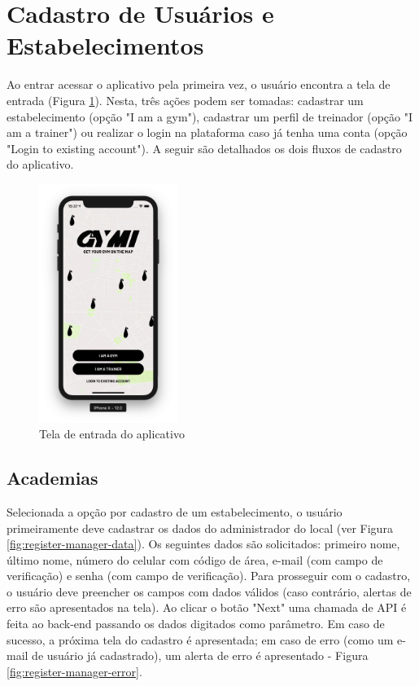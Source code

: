 \section{Cadastro de Usuários e Estabelecimentos}
Ao entrar acessar o aplicativo pela primeira vez, o usuário encontra a tela de entrada (Figura \ref{fig:landing}). Nesta, três ações podem ser tomadas: cadastrar um estabelecimento (opção "I am a gym"), cadastrar um perfil de treinador (opção "I am a trainer") ou realizar o login na plataforma caso já tenha uma conta (opção "Login to existing account"). A seguir são detalhados os dois fluxos de cadastro do aplicativo.
\begin{figure}[H]
    \centering
    \includegraphics[width=0.4\textwidth]{pfc/figuras/landing.png}
    \caption{Tela de entrada do aplicativo}
    \label{fig:landing}
\end{figure}

\subsection{Academias} \label{sec:register-gym}
Selecionada a opção por cadastro de um estabelecimento, o usuário primeiramente deve cadastrar os dados do administrador do local (ver Figura \ref{fig:register-manager-data}). Os seguintes dados são solicitados: primeiro nome, último nome, número do celular com código de área, e-mail (com campo de verificação) e senha (com campo de verificação). Para prosseguir com o cadastro, o usuário deve preencher os campos com dados válidos (caso contrário, alertas de erro são apresentados na tela). Ao clicar o botão "Next" uma chamada de API é feita ao back-end passando os dados digitados como parâmetro. Em caso de sucesso, a próxima tela do cadastro é apresentada; em caso de erro (como um e-mail de usuário já cadastrado), um alerta de erro é apresentado - Figura \ref{fig:register-manager-error}.

